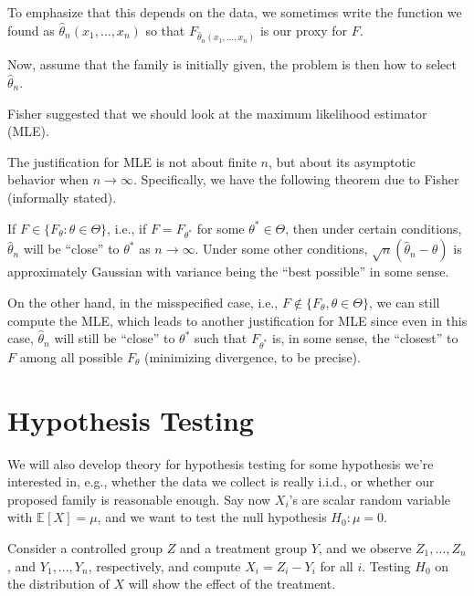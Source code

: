 \begin{note}
	To emphasize that this depends on the data, we sometimes write the function we found as \(\hat{\theta} _n(x_1, \dots  , x_n)\) so that \(F_{\hat{\theta} _n(x_1, \dots , x_n)} \) is our proxy for \(F\).
\end{note}

Now, assume that the family is initially given, the problem is then how to select \(\hat{\theta} _n\).

\begin{eg}
	Fisher suggested that we should look at the maximum likelihood estimator (MLE).
\end{eg}

The justification for MLE is not about finite \(n\), but about its asymptotic behavior when \(n \to \infty \). Specifically, we have the following theorem due to Fisher (informally stated).

\begin{theorem}[Fisher]
	If \(F \in \{ F_\theta \colon \theta \in \Theta \} \), i.e., if \(F = F_{\theta ^{\ast} }\) for some \(\theta ^{\ast} \in \Theta \), then under certain conditions, \(\hat{\theta} _n\) will be ``close'' to \(\theta ^{\ast} \) as \(n \to \infty \). Under some other conditions, \(\sqrt{n}  (\hat{\theta} _n - \theta )\) is approximately Gaussian with variance being the ``best possible'' in some sense.
\end{theorem}

On the other hand, in the misspecified case, i.e., \(F \notin \{ F_{\theta } , \theta \in \Theta \} \), we can still compute the MLE, which leads to another justification for MLE since even in this case, \(\hat{\theta} _n\) will still be ``close'' to \(\theta ^{\ast} \) such that \(F_{\theta ^{\ast} }\) is, in some sense, the ``closest'' to \(F\) among all possible \(F_\theta \) (minimizing divergence, to be precise).

\section{Hypothesis Testing}
We will also develop theory for hypothesis testing for some hypothesis we're interested in, e.g., whether the data we collect is really i.i.d., or whether our proposed family is reasonable enough. Say now \(X_i\)'s are scalar random variable with \(\mathbb{E}_{}\left[X \right] = \mu \), and we want to test the null hypothesis \(H_0 \colon \mu = 0\).

\begin{eg}
	Consider a controlled group \(Z\) and a treatment group \(Y\), and we observe \(Z_1, \dots , Z_n\), and \(Y_1, \dots , Y_n\), respectively, and compute \(X_i = Z_i - Y_i\) for all \(i\). Testing \(H_0\) on the distribution of \(X\) will show the effect of the treatment.
\end{eg}

